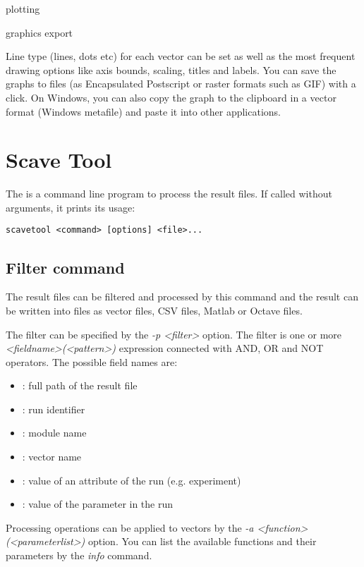 plotting

graphics export

Line type (lines, dots etc) for each vector can be set
as well as the most frequent drawing options like axis bounds, scaling, titles
and labels. You can save the graphs to files (as Encapsulated Postscript or
raster formats such as GIF) with a click. On Windows, you can also
copy the graph to the clipboard in a vector format (Windows metafile)
and paste it into other applications.


\section{Scave Tool}

The  is a command line program to process the result
files. If called without arguments, it prints its usage:

\begin{verbatim}
scavetool <command> [options] <file>...
\end{verbatim}

\subsection{Filter command}

The result files can be filtered and processed by this command and the
result can be written into files as vector files, CSV files,
Matlab or Octave files.

The filter can be specified by the {\itshape -p <filter>} option.
The filter is one or more {\itshape <fieldname>(<pattern>)} expression
connected with AND, OR and NOT operators. The possible field names are:

\begin{itemize}
    \item{}: full path of the result file
    \item{}: run identifier
    \item{}: module name
    \item{}: vector name
    \item{}: value of an attribute of the run
                                   (e.g. experiment)
    \item{}: value of the parameter in the run
\end{itemize}

Processing operations can be applied to vectors by the
{\itshape -a <function>(<parameterlist>)} option. You can list
the available functions and their parameters by the {\itshape info} command.

